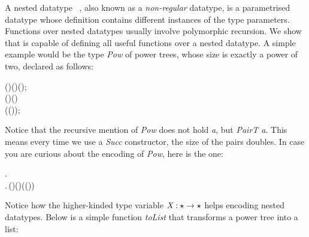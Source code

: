 A nested datatype~\cite{nesteddt}  ,
also known as a \emph{non-regular} datatype, is a parametrised
datatype whose definition contains different instances of the type
parameters. Functions over nested datatypes usually involve
polymorphic recursion. We show that \sufcc is capable of defining all
useful functions over a nested datatype. A simple example would be the
type \emph{Pow} of power trees, whose size is exactly a power of two,
declared as follows:
\begin{hscode}\SaveRestoreHook
{}%
%
%
%
\>[3]{}\;\;(\mathbin{:}\star)\mathrel{=}\;(\mathbin{:})\;(\mathbin{:});{}\<[E]%
\\
\>[3]{}\;\;(\mathbin{:}\star)\mathrel{=}\;(\mathbin{:}){}\<[E]%
\\
\>[3]{}\<[5]%
\>[5]{}\mid {}\;(\mathbin{:}\;(\;));{}\<[E]%
\ColumnHook
\end{hscode}\resethooks
Notice that the recursive mention of \emph{Pow} does not hold
\emph{a}, but \emph{PairT a}. This means every time we use a
\emph{Succ} constructor, the size of the pairs doubles. In case you
are curious about the encoding of \emph{Pow}, here is the one:
\begin{hscode}\SaveRestoreHook
{}%
%
%
%
\>[3]{}\;\mathbin{:}\star\to \star\mathrel{=}\;\mathbin{:}\star\to \star.\,{}\<[E]%
\\
\>[3]{}\<[7]%
\>[7]{}\lambda {}\mathbin{:}\star.\,(\mathbin{:}\star)\to (\to {})\to (\;(\;)\to {})\to {}\<[E]%
\ColumnHook
\end{hscode}\resethooks
Notice how the higher-kinded type variable \ensuremath{\Conid{X}\mathbin{:}\star\to \star} helps encoding
nested datatypes. Below is a simple function \emph{toList} that
transforms a power tree into a list:
